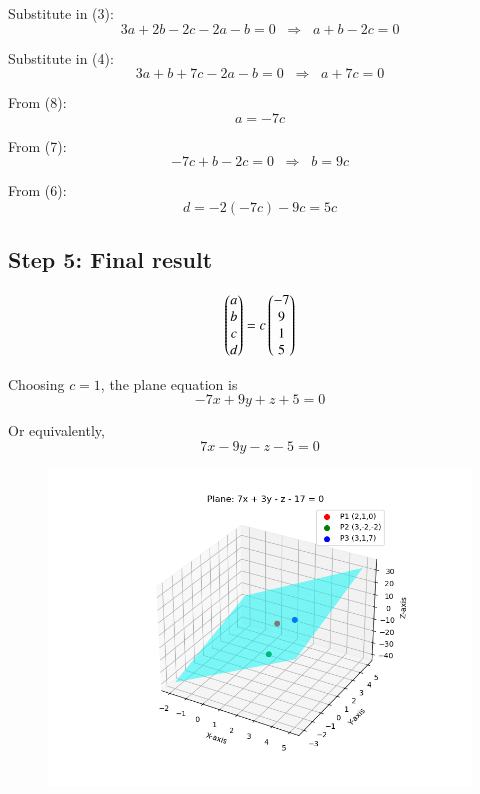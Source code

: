 \documentclass[journal]{IEEEtran}
\begin{document}
Substitute in (3):
\[
3a + 2b - 2c - 2a - b = 0 \;\;\Rightarrow\;\; a + b - 2c = 0 \tag{7}
\]

Substitute in (4):
\[
3a + b + 7c - 2a - b = 0 \;\;\Rightarrow\;\; a + 7c = 0 \tag{8}
\]

From (8):
\[
a = -7c \tag{9}
\]

From (7):
\[
-7c + b - 2c = 0 \;\;\Rightarrow\;\; b = 9c \tag{10}
\]

From (6):
\[
d = -2(-7c) - 9c = 5c \tag{11}
\]
\subsection*{Step 5: Final result}
\[
\begin{pmatrix}a\\ b\\ c\\ d\end{pmatrix} = c \begin{pmatrix}-7\\ 9\\ 1\\ 5\end{pmatrix}
\]

Choosing \(c=1\), the plane equation is
\[
-7x + 9y + z + 5 = 0 \tag{12}
\]

Or equivalently,
\[
\boxed{7x - 9y - z - 5 = 0 }\tag{13}
\]
\begin{figure}[H]
\begin{center}
\includegraphics[width=0.6\columnwidth]{figs/fig6.png}
\end{center}
\caption{}
\label{fig:Fig}
\end{figure}
\end{document}
